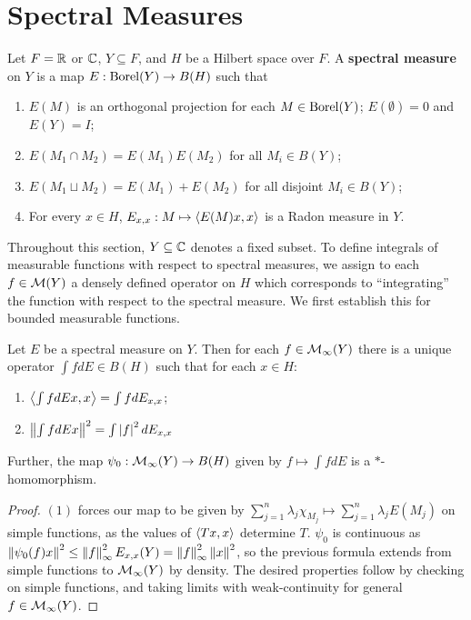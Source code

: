 \documentclass[10pt]{amsart}
\begin{document}
\section{Spectral Measures}
\begin{definition}
    Let $F = \mathbb{R}$ or $\mathbb{C}$, $Y \subseteq F$, and $H$ be a Hilbert space over $F$. A \textbf{spectral measure} on $Y$ is a map $E : \operatorname{Borel}(Y) \to B(H)$ such that
    \begin{enumerate}
        \item $E(M)$ is an orthogonal projection for each $M \in \operatorname{Borel}(Y)$; $E(\emptyset) = 0$ and $E(Y) = I$;
        \item $E(M_1 \cap M_2) = E(M_1)E(M_2)$ for all $M_i \in B(Y)$;
        \item $E(M_1 \sqcup M_2) = E(M_1) + E(M_2)$ for all disjoint $M_i \in B(Y)$;
        \item For every $x \in H$, $E_{x, x} : M \mapsto \left\langle E(M)x, x \right\rangle$ is a Radon measure in $Y$.
    \end{enumerate}
\end{definition}
Throughout this section, $Y \subseteq \mathbb{C}$ denotes a fixed subset. To define integrals of measurable functions with respect to spectral measures, we assign to each $f \in \mathcal{M}(Y)$ a densely defined operator on $H$ which corresponds to ``integrating'' the function with respect to the spectral measure. We first establish this for bounded measurable functions.
\begin{lemma}\label{bdint}
    Let $E$ be a spectral measure on $Y$. Then for each $f \in \mathcal{M}_\infty(Y)$ there is a unique operator $\int f dE \in B(H)$ such that for each $x \in H$:
    \begin{enumerate}
        \item $\left\langle \int f dEx, x \right\rangle = \int f dE_{x, x}$;
        \item $\left\| \int f dE x \right\|^2 = \int\left| f \right|^2 dE_{x, x}$
    \end{enumerate}
    Further, the map $\psi_0 : \mathcal{M}_\infty(Y) \to B(H)$ given by $f \mapsto \int f dE$ is a $*$-homomorphism.
\end{lemma}
\begin{proof}
    $(1)$ forces our map to be given by $\sum_{j = 1}^n \lambda_j \chi_{M_j} \mapsto \sum_{j = 1}^n \lambda_j E(M_j)$ on simple functions, as the values of $\left\langle Tx, x \right\rangle$ determine $T$. $\psi_0$ is continuous as $\left\| \psi_0(f)x \right\|^2 \leq \left\| f \right\|^2_\infty E_{x, x}(Y) = \left\| f \right\|_\infty^2\left\| x \right\|^2$, so the previous formula extends from simple functions to $\mathcal{M}_\infty(Y)$ by density. The desired properties follow by checking on simple functions, and taking limits with weak-continuity for general $f \in \mathcal{M}_\infty(Y)$.
\end{proof}
\end{document}
